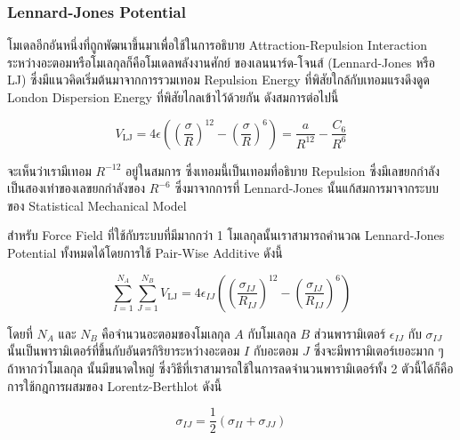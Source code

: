 \subsubsection{Lennard-Jones Potential}

โมเดลอีกอันหนึ่งที่ถูกพัฒนาขึ้นมาเพื่อใช้ในการอธิบาย Attraction-Repulsion Interaction ระหว่างอะตอมหรือโมเลกุลก็คือโมเดลพลังงานศักย์%
ของเลนนาร์ด-โจนส์ (Lennard-Jones หรือ LJ) ซึ่งมีแนวคิดเริ่มต้นมาจากการรวมเทอม Repulsion Energy ที่พิสัยใกล้กับเทอมแรงดึงดูด London
Dispersion Energy ที่พิสัยไกลเข้าไว้ด้วยกัน ดังสมการต่อไปนี้

\begin{equation}
  V_{\text{LJ}}
  =
  4 \epsilon
  \left(
  \left(
    \frac{\sigma}{R}
    \right)^{12}
  -
  \left(
    \frac{\sigma}{R}
    \right)^{6}
  \right)
  =
  \frac{a}{R^{12}}
  - \frac{C_{6}}{R^{6}}
\end{equation}

\noindent จะเห็นว่าเรามีเทอม $R^{-12}$ อยู่ในสมการ ซึ่งเทอมนี้เป็นเทอมที่อธิบาย Repulsion ซึ่งมีเลขยกกำลังเป็นสองเท่าของเลขยกกำลังของ
$R^{-6}$ ซึ่งมาจากการที่ Lennard-Jones นั้นแก้สมการมาจากระบบของ Statistical Mechanical Model

สำหรับ Force Field ที่ใช้กับระบบที่มีมากกว่า 1 โมเลกุลนั้นเราสามารถคำนวณ Lennard-Jones Potential ทั้งหมดได้โดยการใช้ Pair-Wise
Additive ดังนี้

\begin{equation}
  \sum^{N_{A}}_{I=1}
  \sum^{N_{B}}_{J=1}
  V_{\text{LJ}}
  =
  4 \epsilon_{IJ}
  \left(
  \left(
    \frac{\sigma_{IJ}}{R_{IJ}}
    \right)^{12}
  -
  \left(
    \frac{\sigma_{IJ}}{R_{IJ}}
    \right)^{6}
  \right)
\end{equation}

\noindent โดยที่ $N_{A}$ และ $N_{B}$ คือจำนวนอะตอมของโมเลกุล $A$ กับโมเลกุล $B$ ส่วนพารามิเตอร์ $\epsilon_{IJ}$ กับ
$\sigma_{IJ}$ นั้นเป็นพารามิเตอร์ที่ขึ้นกับอันตรกิริยาระหว่างอะตอม $I$ กับอะตอม $J$ ซึ่งจะมีพารามิเตอร์เยอะมาก ๆ ถ้าหากว่าโมเลกุล%
นั้นมีขนาดใหญ่ ซึ่งวิธีที่เราสามารถใช้ในการลดจำนวนพารามิเตอร์ทั้ง 2 ตัวนี้ได้ก็คือการใช้กฎการผสมของ Lorentz-Berthlot ดังนี้

\begin{equation}
  \sigma_{IJ}
  =
  \frac{1}{2}
  (\sigma_{II}
  + \sigma_{JJ})
\end{equation}


